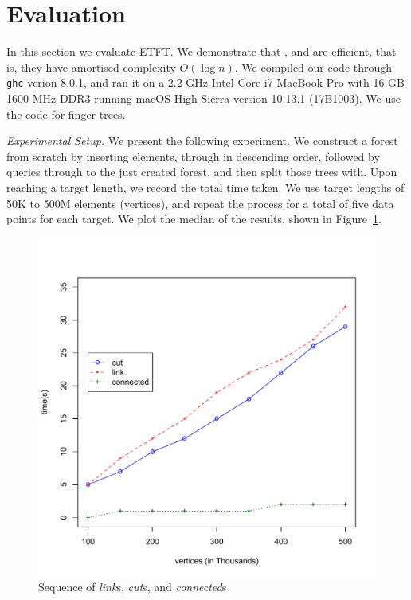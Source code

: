 \section{Evaluation} 
\label{sec:Eval} 


In this section we evaluate ETFT. We demonstrate that ,  and  are efficient, that is, they have amortised complexity $O(\log n)$.
We compiled our code through \texttt{ghc} verion 8.0.1, and ran it on a 2.2 GHz Intel Core i7 MacBook Pro with 16 GB 1600 MHz DDR3 running macOS High Sierra version 10.13.1 (17B1003). We use the \cite{HaskellFT} code for finger trees.




\textit{Experimental Setup.} We present the following experiment. We construct a forest from scratch by inserting elements, through  in descending order, followed by queries through  to the just created forest, and then split those trees with. Upon reaching a target length, we record the total time taken. We use target lengths of 50K to 500M elements (vertices), and repeat the process for a total of five data points for each target. We plot the median of the results, shown in Figure~\ref{fig:plot1}. 
\begin{figure}
\begin{center}
\includegraphics[scale=0.55]{./Images/plot1} 
\end{center}
\caption{Sequence of \textit{link}s, \textit{cut}s, and \textit{connected}s}
\label{fig:plot1}
\end{figure}


